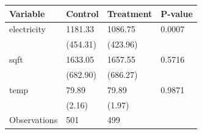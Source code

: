 \begin{tabular}{llll}
\toprule
Variable & Control & Treatment & P-value \\
\midrule
electricity & 1181.33 & 1086.75 & 0.0007 \\
 & (454.31) & (423.96) &  \\
sqft & 1633.05 & 1657.55 & 0.5716 \\
 & (682.90) & (686.27) &  \\
temp & 79.89 & 79.89 & 0.9871 \\
 & (2.16) & (1.97) &  \\
Observations & 501 & 499 &  \\
\bottomrule
\end{tabular}
